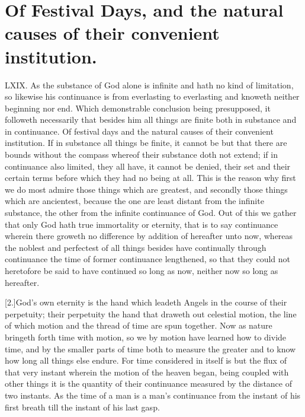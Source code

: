 \section*{Of Festival Days, and the natural causes of their convenient institution.}
LXIX. As the substance of God alone is infinite and hath no kind of limitation, so likewise his continuance is from everlasting to everlasting and knoweth neither beginning nor end. Which demonstrable conclusion being presupposed, it followeth necessarily that besides him all things are finite both in substance and in continuance.
Of festival days and the natural causes of their convenient institution.
 If in substance all things be finite, it cannot be but that there are bounds without the compass whereof their substance doth not extend; if in continuance also limited, they all have, it cannot be denied, their set and their certain terms before which they had no being at all. This is the reason why first we do most admire those things which are greatest, and secondly those things which are ancientest, because the one are least distant from the infinite substance, the other from the infinite continuance of God. Out of this we gather that only God hath true immortality or eternity, that is to say continuance wherein there groweth no difference by addition of hereafter unto now, whereas the noblest and perfectest of all things besides have continually through continuance the time of former continuance lengthened, so that they could not heretofore be said to have continued so long as now, neither now so long as hereafter.

[2.]God’s own eternity is the hand which leadeth Angels in the course of their perpetuity; their perpetuity the hand that draweth out celestial motion, the line of which motion and the thread of time are spun together. Now as nature  bringeth forth time with motion,
 so we by motion have learned how to divide time, and by the smaller parts of time both to measure the greater and to know how long all things else endure. For time considered in itself is but the flux of that very instant wherein the motion of the heaven began, being coupled with other things it is the quantity of their continuance measured by the distance of two instants. As the time of a man is a man’s continuance from the instant of his first breath till the instant of his last gasp.

